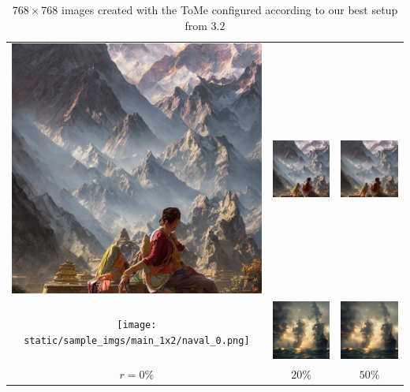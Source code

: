 \begin{table}[!htb]
\centering
\begin{tabular}{c c c}
    \includegraphics[width=0.3\linewidth]{static/sample_imgs/main_1x2/nepal_0.png} & \includegraphics[width=0.3\linewidth]{static/sample_imgs/main_1x2/nepal_20.png} &
    \includegraphics[width=0.3\linewidth]{static/sample_imgs/main_1x2/nepal_50.png}\\
    \texttt{[image: static/sample\_imgs/main\_1x2/naval\_0.png]} & \includegraphics[width=0.3\linewidth]{static/sample_imgs/main_1x2/naval_20.png} &
    \includegraphics[width=0.3\linewidth]{static/sample_imgs/main_1x2/naval_50.png}\\
    \(r=0\%\) & \(20\%\) & \(50\%\) \\
\end{tabular}
\caption{$768 \times 768$ images created with the ToMe configured according to our best setup from \(3.2\)}
\end{table}
